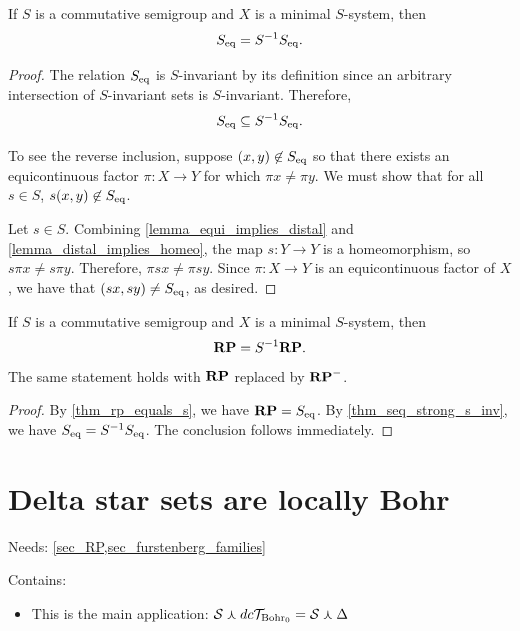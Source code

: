 \begin{lemma}
\label{thm_seq_strong_s_inv}
\leanok{}
    If $S$ is a commutative semigroup and $X$ is a minimal $S$-system, then
    \[S_\text{eq} = S^{-1} S_\text{eq}.\]
\end{lemma}

\begin{proof}
    The relation $S_\text{eq}$ is $S$-invariant by its definition since an arbitrary intersection of $S$-invariant sets is $S$-invariant.  Therefore,
    \[S_\text{eq} \subseteq S^{-1}S_\text{eq}.\]
    
    To see the reverse inclusion, suppose $(x,y) \not\in S_\text{eq}$ so that there exists an equicontinuous factor $\pi: X \to Y$ for which $\pi x \neq \pi y$.  We must show that for all $s \in S$, $s(x,y) \not\in S_\text{eq}$.
    
    Let $s \in S$. Combining \cref{lemma_equi_implies_distal} and \cref{lemma_distal_implies_homeo}, the map $s: Y \to Y$ is a homeomorphism, so $s \pi x \neq s \pi y$.  Therefore, $\pi s x \neq \pi s y$.  Since $\pi: X \to Y$ is an equicontinuous factor of $X$, we have that $(sx, sy) \neq S_\text{eq}$, as desired. 
\end{proof}

\begin{theorem}
\label{thm_rp_strong_s_inv}
\leanok{}
    If $S$ is a commutative semigroup and $X$ is a minimal $S$-system, then
    \[\mathbf{RP} = S^{-1} \mathbf{RP}.\]
    The same statement holds with $\mathbf{RP}$ replaced by $\mathbf{RP}^-$.
\end{theorem}

\begin{proof}
    By \cref{thm_rp_equals_s}, we have $\mathbf{RP} = S_\text{eq}$. By \cref{thm_seq_strong_s_inv}, we have $S_\text{eq} = S^{-1} S_\text{eq}$. The conclusion follows immediately.
\end{proof}

\section{Delta star sets are locally Bohr}
\label{sec_delta_star_locally_bohr}

Needs: \cref{sec_RP,sec_furstenberg_families}

Contains:
\begin{itemize}
    \item This is the main application: $\mathcal{S} \curlywedge dc\mathcal{T}_{\text{Bohr}_0} = \mathcal{S} \curlywedge \Delta$
\end{itemize}


